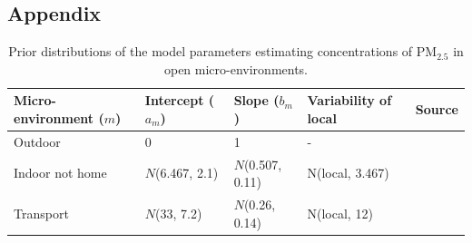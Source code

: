 \documentclass{article}
\begin{document}
\begin{appendix}


\setcounter{figure}{0} \renewcommand{\thefigure}{A.\arabic{figure}}
\setcounter{table}{0} \renewcommand{\thetable}{A.\arabic{table}}

\clearpage
\section{Appendix}


\renewcommand{\arraystretch}{1.5}

\begin{table}[H]
	\centering
	\caption{Prior distributions of the model parameters estimating concentrations of PM$_{2.5}$ in open micro-environments.}
	\begin{tabular}{l l l l l}
		\hline \hline 
		Micro-environment ($m$) & Intercept ($a_m$) & Slope ($b_m$) & Variability of local & Source \\
		\hline 
		Outdoor                 & 0               & 1           & -                     & \citet{zidek2007framework} \\ 
		Indoor not home         & $N$(6.467, 2.1) & $N$(0.507, 0.11) & N(local, 3.467) & \citet{burke2001population} \\
		Transport               & $N$(33, 7.2)    & $N$(0.26, 0.14) &  N(local, 12) & \citet{burke2001population} \\
		\hline \hline 
	\end{tabular}
	\label{tab::openmicro}
\end{table}


\end{appendix}
\end{document}
